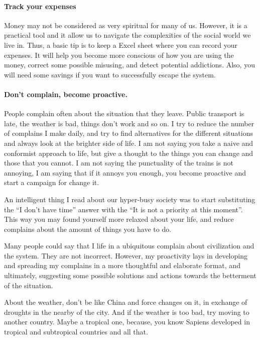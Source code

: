 \documentclass{article}
\begin{document}
\paragraph{Track your expenses}
Money may not be considered as very spiritual for many of us. However, it is a practical tool and it allow us to navigate the complexities of the social world we live in. Thus, a basic tip is to keep a Excel sheet where you can record your expenses. It will help you become more conscious of how you are using the money, correct some possible misusing, and detect potential addictions. Also, you will need some savings if you want to successfully escape the system.

\paragraph{Don’t complain, become proactive.} 
People complain often about the situation that they leave. Public transport is late, the weather is bad, things don’t work and so on. I try to reduce the number of complains I make daily, and try to find alternatives for the different situations and always look at the brighter side of life. I am not saying you take a naive and conformist approach to life, but give a thought to the things you can change and those that you cannot. I am not saying the punctuality of the trains is not annoying, I am saying that if it annoys you enough, you become proactive and start a campaign for change it. 

An intelligent thing I read about our hyper-busy society was to start substituting the ``I don’t have time'' answer with the ``It is not a priority at this moment''. This way you may found yourself more relaxed about your life, and reduce complains about the amount of things you have to do. 

Many people could say that I life in a ubiquitous complain about civilization and the system. They are not incorrect. However, my proactivity lays in developing and spreading my complains in a more thoughtful and elaborate format, and ultimately, suggesting some possible solutions and actions towards the betterment of the situation. 

About the weather, don’t be like China and force changes on it, in exchange of droughts in the nearby of the city. And if the weather is too bad, try moving to another country. Maybe a tropical one, because, you know Sapiens developed in tropical and subtropical countries and all that.
\end{document}
